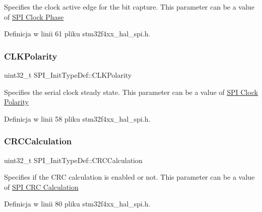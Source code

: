 Specifies the clock active edge for the bit capture. This parameter can be a value of \hyperlink{group___s_p_i___clock___phase}{S\+PI Clock Phase} 

Definicja w linii 61 pliku stm32f4xx\+\_\+hal\+\_\+spi.\+h.

\mbox{\label{struct_s_p_i___init_type_def_a96922c7ff9e589ebd9611fc4ab730454}} 
\subsubsection{\texorpdfstring{C\+L\+K\+Polarity}{CLKPolarity}}
{\footnotesize\ttfamily uint32\+\_\+t S\+P\+I\+\_\+\+Init\+Type\+Def\+::\+C\+L\+K\+Polarity}

Specifies the serial clock steady state. This parameter can be a value of \hyperlink{group___s_p_i___clock___polarity}{S\+PI Clock Polarity} 

Definicja w linii 58 pliku stm32f4xx\+\_\+hal\+\_\+spi.\+h.

\mbox{\label{struct_s_p_i___init_type_def_a3472de9bd9247c1d97312aff7e58e385}} 
\subsubsection{\texorpdfstring{C\+R\+C\+Calculation}{CRCCalculation}}
{\footnotesize\ttfamily uint32\+\_\+t S\+P\+I\+\_\+\+Init\+Type\+Def\+::\+C\+R\+C\+Calculation}

Specifies if the C\+RC calculation is enabled or not. This parameter can be a value of \hyperlink{group___s_p_i___c_r_c___calculation}{S\+PI C\+RC Calculation} 

Definicja w linii 80 pliku stm32f4xx\+\_\+hal\+\_\+spi.\+h.

\mbox{\label{struct_s_p_i___init_type_def_abdaf3ccbfa4ef68cc81fd32f29baa678}} 
